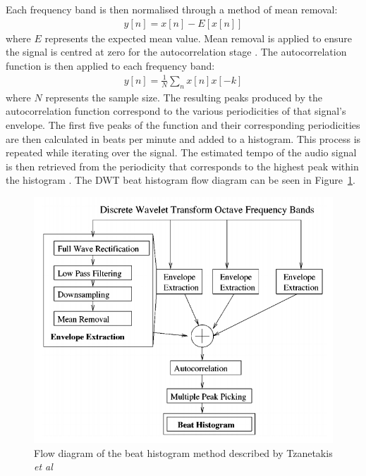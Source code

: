 \documentclass[a4paper, 11pt]{article}
\begin{document}
Each frequency band is then normalised through a method of mean removal:
\begin{equation}
\begin{split}
y[n] = x[n] - E[x[n]]
\end{split}
\end{equation}
where $E$ represents the expected mean value. Mean removal is applied to ensure the signal is centred at zero for the autocorrelation stage \cite{tzane3}. The autocorrelation function is then applied to each frequency band:
\begin{equation}
\begin{split}
y[n] = \frac{1}{N}\sum_{n} x[n]x[-k]
\end{split}
\end{equation}
where $N$ represents the sample size. The resulting peaks produced by the autocorrelation function correspond to the various periodicities of that signal's envelope. The first five peaks of the function and their corresponding periodicities are then calculated in beats per minute and added to a histogram. This process is repeated while iterating over the signal. The estimated tempo of the audio signal is then retrieved from the periodicity that corresponds to the highest peak within the histogram \cite{tzane1}. The DWT beat histogram flow diagram can be seen in Figure~\ref{fig: dwtFlow}.

\begin{figure}[ht]
	\centering
	\includegraphics[scale=0.35]{images/dwtflow.jpg}
	\caption{Flow diagram of the beat histogram method described by Tzanetakis \textit{et al} \cite{tzane3}}
	\label{fig: dwtFlow}
\end{figure}
\end{document}
